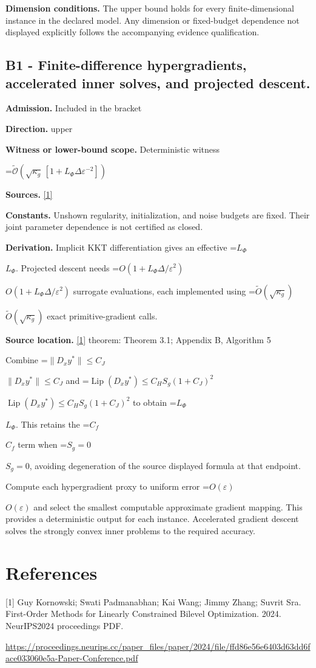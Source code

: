 \documentclass[10pt,a4paper]{article}
\newcommand{\AtlasMath}[1]{\par\begingroup\centering\setbox0=\hbox{$\displaystyle #1$}\ifdim\wd0>1.4\linewidth\typeout{ATLAS WIDE FORMULA: \the\wd0}\fi\ifdim\wd0>\linewidth\resizebox{\linewidth}{!}{\box0}\else\box0\fi\par\endgroup}
\newcommand{\AtlasInlineMath}[1]{\begingroup\setbox0=\hbox{$#1$}\ifdim\wd0>.4\linewidth\endgroup\AtlasMath{#1}\else\endgroup$#1$\fi}
\begin{document}
\textbf{Dimension conditions.} The upper bound holds for every finite-dimensional instance in the declared model. Any dimension or fixed-budget dependence not displayed explicitly follows the accompanying evidence qualification.

\subsection{B1 - Finite-difference hypergradients, accelerated inner solves, and projected descent.}
\textbf{Admission.} Included in the bracket

\textbf{Direction.} upper

\textbf{Witness or lower-bound scope.} Deterministic witness

\AtlasMath{\widetilde{\mathcal{O}}\!\left(\sqrt{\kappa_g}\,[1+L_\Phi\Delta\varepsilon^{-2}]\right)}
\textbf{Sources.} \href{https://proceedings.neurips.cc/paper_files/paper/2024/file/ffd86e56e6403d63dd6face033060e5a-Paper-Conference.pdf}{[1]}

\textbf{Constants.} Unshown regularity, initialization, and noise budgets are fixed. Their joint parameter dependence is not certified as closed.

\textbf{Derivation.} Implicit KKT differentiation gives an effective \AtlasInlineMath{L_\Phi}. Projected descent needs \AtlasInlineMath{O(1+L_\Phi\Delta/\varepsilon^2)} surrogate evaluations, each implemented using \AtlasInlineMath{\widetilde O(\sqrt{\kappa_g})} exact primitive-gradient calls.

\textbf{Source location.} \href{https://proceedings.neurips.cc/paper_files/paper/2024/file/ffd86e56e6403d63dd6face033060e5a-Paper-Conference.pdf}{[1]} theorem: Theorem 3.1; Appendix B, Algorithm 5

Combine \AtlasInlineMath{\|D_xy^*\|\le C_J} and \AtlasInlineMath{\operatorname{Lip}(D_xy^*)\le C_HS_g(1+C_J)^2} to obtain \AtlasInlineMath{L_\Phi}. This retains the \AtlasInlineMath{C_f} term when \AtlasInlineMath{S_g=0}, avoiding degeneration of the source displayed formula at that endpoint.

Compute each hypergradient proxy to uniform error \AtlasInlineMath{O(\varepsilon)} and select the smallest computable approximate gradient mapping. This provides a deterministic output for each instance. Accelerated gradient descent solves the strongly convex inner problems to the required accuracy.

\section{References}
[1] Guy Kornowski; Swati Padmanabhan; Kai Wang; Jimmy Zhang; Suvrit Sra. First-Order Methods for Linearly Constrained Bilevel Optimization. 2024. NeurIPS2024 proceedings PDF.

\url{https://proceedings.neurips.cc/paper_files/paper/2024/file/ffd86e56e6403d63dd6face033060e5a-Paper-Conference.pdf}
\end{document}
